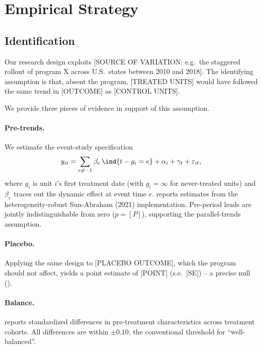 
\section{Empirical Strategy}\label{sec:strategy}

\subsection{Identification}\label{sec:identification}

Our research design exploits [SOURCE OF VARIATION: e.g.\ the staggered
rollout of program X across U.S.\ states between 2010 and 2018]. The
identifying assumption is that, absent the program, [TREATED UNITS]
would have followed the same trend in [OUTCOME] as [CONTROL UNITS].

We provide three pieces of evidence in support of this assumption.

\paragraph{Pre-trends.} We estimate the event-study specification
%
\begin{equation}\label{eq:event_study}
y_{it} = \sum_{e \neq -1} \beta_e \, \ind\{t - g_i = e\}
       + \alpha_i + \gamma_t + \varepsilon_{it},
\end{equation}
%
where $g_i$ is unit $i$'s first treatment date (with $g_i = \infty$
for never-treated units) and $\beta_e$ traces out the dynamic effect
at event time $e$.  reports estimates from the
heterogeneity-robust Sun-Abraham (2021) implementation. Pre-period
leads are jointly indistinguishable from zero ($p = [P]$), supporting
the parallel-trends assumption.

\paragraph{Placebo.} Applying the same design to [PLACEBO OUTCOME],
which the program should not affect, yields a point estimate of
[POINT] (s.e.\ [SE]) -- a precise null ().

\paragraph{Balance.}  reports standardized
differences in pre-treatment characteristics across treatment cohorts.
All differences are within $\pm 0.10$, the conventional
\citet{ImbensRubin2015} threshold for ``well-balanced''.

